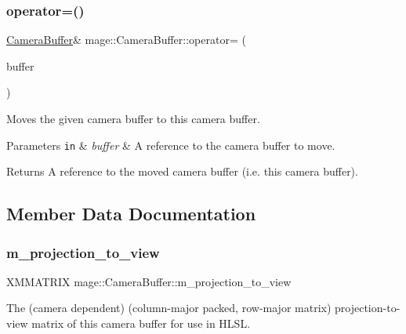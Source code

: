 \subsubsection{\texorpdfstring{operator=()}{operator=()}\hspace{0.1cm}{\footnotesize\ttfamily [2/2]}}
{\footnotesize\ttfamily \hyperlink{structmage_1_1_camera_buffer}{Camera\+Buffer}\& mage\+::\+Camera\+Buffer\+::operator= (\begin{DoxyParamCaption}\item[{\hyperlink{structmage_1_1_camera_buffer}{Camera\+Buffer} \&\&}]{buffer }\end{DoxyParamCaption})\hspace{0.3cm}{\ttfamily [default]}}

Moves the given camera buffer to this camera buffer.


\begin{DoxyParams}[1]{Parameters}
\mbox{\tt in}  & {\em buffer} & A reference to the camera buffer to move. \\
\hline
\end{DoxyParams}
\begin{DoxyReturn}{Returns}
A reference to the moved camera buffer (i.\+e. this camera buffer). 
\end{DoxyReturn}


\subsection{Member Data Documentation}
\hypertarget{structmage_1_1_camera_buffer_ad64e571c4fd9595c2fcd40bfd602e024}{}\label{structmage_1_1_camera_buffer_ad64e571c4fd9595c2fcd40bfd602e024} 
\subsubsection{\texorpdfstring{m\+\_\+projection\+\_\+to\+\_\+view}{m\_projection\_to\_view}}
{\footnotesize\ttfamily X\+M\+M\+A\+T\+R\+IX mage\+::\+Camera\+Buffer\+::m\+\_\+projection\+\_\+to\+\_\+view}

The (camera dependent) (column-\/major packed, row-\/major matrix) projection-\/to-\/view matrix of this camera buffer for use in H\+L\+SL. \hypertarget{structmage_1_1_camera_buffer_a6bbc5a57e9f456518afacf0a0e5633ed}{}\label{structmage_1_1_camera_buffer_a6bbc5a57e9f456518afacf0a0e5633ed} 
